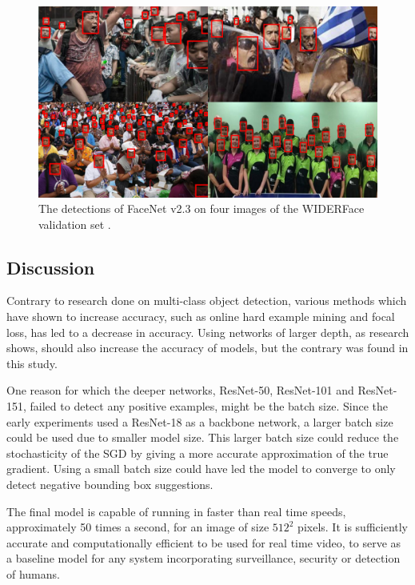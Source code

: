 \documentclass[a4paper, twoside]{article}
\begin{document}
\begin{figure}
\begin{center}
    \includegraphics[width=16cm]{figfacedetection.png}\caption{The detections of FaceNet v2.3 on four images of the WIDERFace validation set \cite{WIDERFace}.} \label{figwiderfaceval}
\end{center}
\end{figure}

\subsection{Discussion}
Contrary to research done on multi-class object detection, various methods which have shown to increase accuracy, such as online hard example mining and focal loss, has led to a decrease in accuracy. Using networks of larger depth, as research \cite{retinanet} \cite{resnet} shows, should also increase the accuracy of models, but the contrary was found in this study.

One reason for which the deeper networks, ResNet-50, ResNet-101 and ResNet-151, failed to detect any positive examples, might be the batch size. Since the early experiments used a ResNet-18 as a backbone network, a larger batch size could be used due to smaller model size. This larger batch size could reduce the stochasticity of the SGD by giving a more accurate approximation of the true gradient. Using a small batch size could have led the model to converge to only detect negative bounding box suggestions.

The final model is capable of running in faster than real time speeds, approximately 50 times a second, for an image of size $512^2$ pixels. It is sufficiently accurate and computationally efficient to be used for real time video, to serve as a baseline model for any system incorporating surveillance, security or detection of humans.
\end{document}

